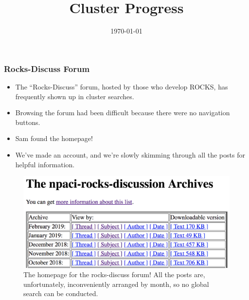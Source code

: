 \documentclass{beamer}
\title{Cluster Progress}
\date{\today}
\begin{document}

\begin{frame}
  \maketitle
\end{frame}



\begin{frame}

  \frametitle{Rocks-Discuss Forum}

  \begin{itemize}
  \item The ``Rocks-Discuss'' forum, hosted by those who develop ROCKS, has
    frequently shown up in cluster searches.
    \item Browsing the forum had been difficult because there were no navigation
      buttons.
    \item Sam found the homepage!
    \item We've made an account, and we're slowly skimming through all the posts
      for helpful information.
  \end{itemize}

  \begin{figure}[H]
    \begin{center}
      \includegraphics[scale=0.3]{rocksDiscussHome.png}
    \end{center}
    \caption{The homepage for the rocks-discuss forum! All the posts are,
      unfortunately, inconveniently arranged by month, so no global search can
      be conducted.}
  \end{figure}

\end{frame}

\end{document}
